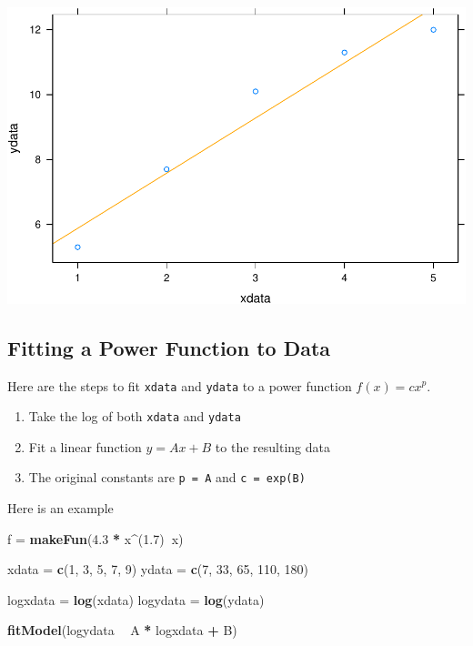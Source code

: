 \documentclass[
]{book}
\newenvironment{Shaded}{\begin{snugshade}}{\end{snugshade}}
\newcommand{\DecValTok}[1]{\textcolor[rgb]{0.00,0.00,0.81}{#1}}
\newcommand{\FloatTok}[1]{\textcolor[rgb]{0.00,0.00,0.81}{#1}}
\newcommand{\KeywordTok}[1]{\textcolor[rgb]{0.13,0.29,0.53}{\textbf{#1}}}
\newcommand{\NormalTok}[1]{#1}
\newcommand{\OperatorTok}[1]{\textcolor[rgb]{0.81,0.36,0.00}{\textbf{#1}}}
\newcommand{\StringTok}[1]{\textcolor[rgb]{0.31,0.60,0.02}{#1}}
\providecommand{\tightlist}{%
  \setlength{\itemsep}{0pt}\setlength{\parskip}{0pt}}
\begin{document}
\includegraphics{_bookdown_files/math135_handbook_files/figure-latex/unnamed-chunk-36-2.pdf}

\hypertarget{fitting-a-power-function-to-data}{%
\subsection{Fitting a Power Function to Data}\label{fitting-a-power-function-to-data}}

Here are the steps to fit \texttt{xdata} and \texttt{ydata} to a power function \(f(x) = c x^p\).

\begin{enumerate}
\def\labelenumi{\arabic{enumi}.}
\tightlist
\item
  Take the log of both \texttt{xdata} and \texttt{ydata}
\item
  Fit a linear function \(y = A x + B\) to the resulting data
\item
  The original constants are \texttt{p\ =\ A} and \texttt{c\ =\ exp(B)}
\end{enumerate}

Here is an example

\begin{Shaded}
\begin{Highlighting}[]
\NormalTok{f =}\StringTok{ }\KeywordTok{makeFun}\NormalTok{(}\FloatTok{4.3} \OperatorTok{*}\StringTok{ }\NormalTok{x}\OperatorTok{^}\NormalTok{(}\FloatTok{1.7}\NormalTok{)}\OperatorTok{~}\NormalTok{x)}

\NormalTok{xdata =}\StringTok{ }\KeywordTok{c}\NormalTok{(}\DecValTok{1}\NormalTok{, }\DecValTok{3}\NormalTok{, }\DecValTok{5}\NormalTok{, }\DecValTok{7}\NormalTok{, }\DecValTok{9}\NormalTok{)}
\NormalTok{ydata =}\StringTok{ }\KeywordTok{c}\NormalTok{(}\DecValTok{7}\NormalTok{, }\DecValTok{33}\NormalTok{, }\DecValTok{65}\NormalTok{, }\DecValTok{110}\NormalTok{, }\DecValTok{180}\NormalTok{)}

\NormalTok{logxdata =}\StringTok{ }\KeywordTok{log}\NormalTok{(xdata)}
\NormalTok{logydata =}\StringTok{ }\KeywordTok{log}\NormalTok{(ydata)}

\KeywordTok{fitModel}\NormalTok{(logydata }\OperatorTok{~}\StringTok{ }\NormalTok{A }\OperatorTok{*}\StringTok{ }\NormalTok{logxdata }\OperatorTok{+}\StringTok{ }\NormalTok{B)}
\end{Highlighting}
\end{Shaded}
\end{document}
